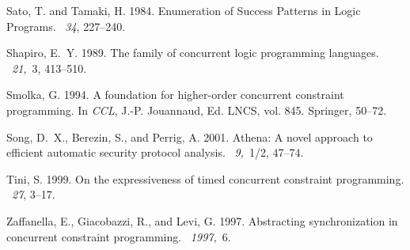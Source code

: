 \documentclass{tlp}
\begin{document}
\begin{thebibliography}{}
{\sc Sato, T.} {\sc and} {\sc Tamaki, H.} 1984.
\newblock Enumeration of {S}uccess {P}atterns in {L}ogic {P}rograms.
~{\em 34}, 227--240.

{\sc Shapiro, E.~Y.} 1989.
\newblock The family of concurrent logic programming languages.
~{\em 21,\/}~3, 413--510.

{\sc Smolka, G.} 1994.
\newblock A foundation for higher-order concurrent constraint programming.
\newblock In {\em CCL}, {J.-P. Jouannaud}, Ed. LNCS, vol. 845. Springer,
  50--72.

{\sc Song, D.~X.}, {\sc Berezin, S.}, {\sc and} {\sc Perrig, A.} 2001.
\newblock Athena: A novel approach to efficient automatic security protocol
  analysis.
~{\em 9,\/}~1/2, 47--74.

{\sc Tini, S.} 1999.
\newblock On the expressiveness of timed concurrent constraint programming.
~{\em 27}, 3--17.

{\sc Zaffanella, E.}, {\sc Giacobazzi, R.}, {\sc and} {\sc Levi, G.} 1997.
\newblock Abstracting synchronization in concurrent constraint programming.
~{\em 1997,\/}~6.

\end{thebibliography}






\newpage
\appendix
\end{document}
